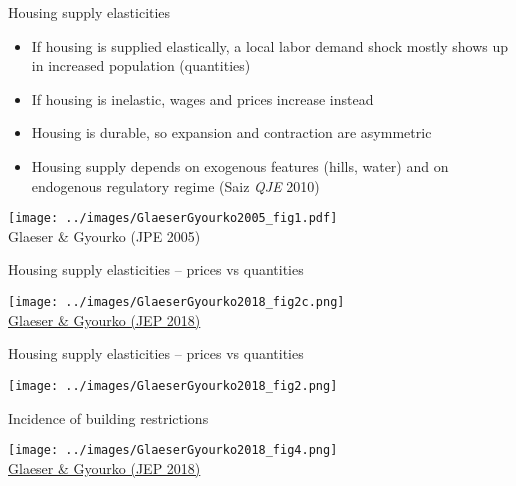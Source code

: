 \documentclass[10pt,notes=hide]{beamer}
\begin{document}
\begin{frame}{Housing supply elasticities}
\begin{itemize}
	\item If housing is supplied elastically, a local labor demand shock mostly shows up in increased population (quantities)
	\item If housing is inelastic, wages and prices increase instead
	\item Housing is durable, so expansion and contraction are asymmetric
	\item Housing supply depends on exogenous features (hills, water) and on endogenous regulatory regime (Saiz \textit{QJE} 2010)
\end{itemize}
\begin{center}
\texttt{[image: ../images/GlaeserGyourko2005\_fig1.pdf]}\\
\vspace{-2mm}
{\small Glaeser \& Gyourko (JPE 2005)}
\end{center}
\end{frame}
\begin{frame}{Housing supply elasticities -- prices vs quantities}
\begin{center}
\texttt{[image: ../images/GlaeserGyourko2018\_fig2c.png]}\\
\href{https://www.aeaweb.org/articles?id=10.1257/jep.32.1.3}{Glaeser \& Gyourko (JEP 2018)}\end{center}
\end{frame}
\begin{frame}{Housing supply elasticities -- prices vs quantities}
\begin{center}
\texttt{[image: ../images/GlaeserGyourko2018\_fig2.png]}
\end{center}
\end{frame}
\begin{frame}{Incidence of building restrictions}
\begin{center}
\texttt{[image: ../images/GlaeserGyourko2018\_fig4.png]}\\
\href{https://www.aeaweb.org/articles?id=10.1257/jep.32.1.3}{Glaeser \& Gyourko (JEP 2018)}\end{center}
\end{frame}
\end{document}
